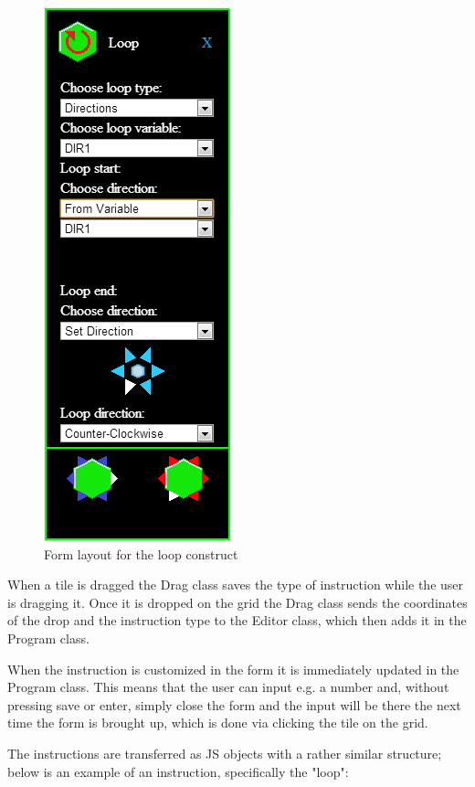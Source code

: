 \begin{figure}[ht]
\begin{center}
\includegraphics[scale=0.5]{img/editor_loop_form.png}
\caption{Form layout for the loop construct}
\label{fig:form_layout}
\end{center}
\end{figure}

When a tile is dragged the Drag class saves the type of instruction while the user is dragging it. Once it is dropped on the grid the Drag class sends the coordinates of the drop and the instruction type to the Editor class, which then adds it in the Program class. 

When the instruction is customized in the form it is immediately updated in the Program class. This means that the user can input e.g. a number and, without pressing save or enter, simply close the form and the input will be there the next time the form is brought up, which is done via clicking the tile on the grid.

The instructions are transferred as JS objects with a rather similar structure; below is an example of an instruction, specifically the "loop":

